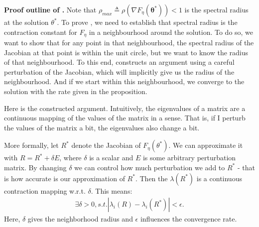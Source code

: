 \documentclass{article}
\renewcommand{\vec}[1]{\ensuremath{\boldsymbol{#1}}}
\begin{document}
\textbf{Proof outline of .} 
Note that $\rho_{max} \triangleq \rho (\nabla F_\eta (\vec{\theta}^*)) < 1$ is the spectral radius at the solution $\theta^*$. To prove , we need to establish that spectral radius is the contraction constant for $F_\eta$ in a neighbourhood around the solution. To do so, we want to show that for any point in that neighbourhood, the spectral radius of the Jacobian at that point is within the unit circle, but we want to know the radius of that neighbourhood. To this end, \citet{Bertsekas/99} constructs an argument using a careful perturbation of the Jacobian, which will implicitly give us the radius of the neighbourhood. And if we start within this neighbourhood, we converge to the solution with the rate given in the proposition.

Here is the constructed argument. Intuitively, the eigenvalues of a matrix are a continuous mapping of the values of the matrix in a sense. That is, if I perturb the values of the matrix a bit, the eigenvalues also change a bit.

More formally, let $R^*$ denote the Jacobian of $F_\eta(\theta^*)$. We can approximate it with $R=R^*+\delta E$, where $\delta$ is a scalar and $E$ is some arbitrary perturbation matrix. By changing  $\delta$ we can control how much perturbation we add to $R^*$ - that is how accurate is our approximation of $R^*$. Then the $\lambda(R^*)$ is a continuous contraction mapping w.r.t. $\delta$. This means:
\begin{align*}
\exists \delta > 0, s.t.
    |\lambda_i(R)-\lambda_i(R^*)|<\epsilon.
\end{align*}
Here, $\delta$ gives the neighborhood radius and $\epsilon$ influences the convergence rate.
\end{document}
